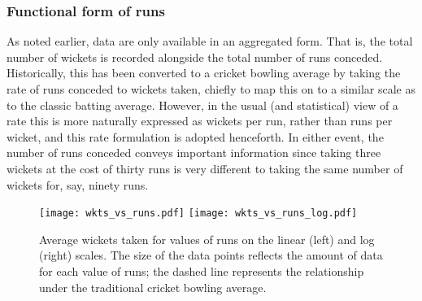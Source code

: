 \documentclass{statsoc}
\begin{document}
\subsubsection{Functional form of runs}\label{subsec:runs}
As noted earlier, data are only available in an aggregated form. %
That is, the total number of wickets is recorded alongside the total number of runs conceded. Historically, this has been converted to a cricket bowling average by taking the rate of runs conceded to wickets taken, chiefly to map this on to a similar scale as to the classic batting average. 
However, in the usual (and statistical) view of a rate this is more naturally expressed as wickets per run, rather than runs per wicket, and this rate formulation is adopted henceforth. In either event, the number of runs conceded conveys important information since taking three wickets at the cost of thirty runs is very different to taking the same number of wickets for, say, ninety runs. 

\begin{figure}
    \centering
    \texttt{[image: wkts\_vs\_runs.pdf]}
     \texttt{[image: wkts\_vs\_runs\_log.pdf]}
    \caption{Average wickets taken for values of runs on the linear (left) and log (right) scales. The size of the data points reflects the amount of data for each value of runs; the dashed line represents the relationship under the traditional cricket bowling average.}
    \label{Fig:wkts_vs_runs}
\end{figure}

\end{document}
